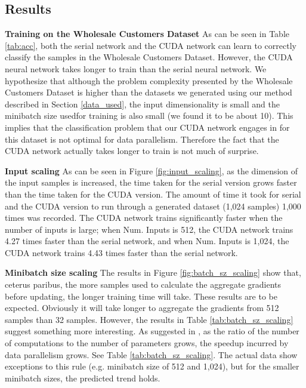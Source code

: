 \documentclass[11pt,a4paper]{article}
\begin{document}
\subsection{Results}
\noindent \textbf{Training on the Wholesale Customers Dataset}
As can be seen in Table \ref{tab:acc}, both the serial network and the CUDA network can learn to correctly classify the samples in the Wholesale Customers Dataset. However, the CUDA neural network takes longer to train than the serial neural network. We hypothesize that although the problem complexity presented by the Wholesale Customers Dataset is higher than the datasets we generated using our method described in Section \ref{data_used}, the input dimensionality is small and the minibatch size usedfor training is also small (we found it to be about 10). This implies that the classification problem that our CUDA network engages in for this dataset is not optimal for data parallelism. Therefore the fact that the CUDA network actually takes longer to train is not much of surprise.

\vspace{10pt}
\noindent \textbf{Input scaling} As can be seen in Figure \ref{fig:input_scaling}, as the dimension of the input samples is increased, the time taken for the serial version grows faster than the time taken for the CUDA version. The amount of time it took for serial and the CUDA version to run through a generated dataset (1,024 samples) 1,000 times was recorded. The CUDA network trains significantly faster when the number of inputs is large; when Num. Inputs is 512, the CUDA network trains 4.27 times faster than the serial network, and when Num. Inputs is 1,024, the CUDA network trains 4.43 times faster than the serial network. 

\vspace{10pt}
\noindent \textbf{Minibatch size scaling} The results in Figure  \ref{fig:batch_sz_scaling} show that, ceterus paribus, the more samples used to calculate the aggregate gradients before updating, the longer training time will take. These results are to be expected. Obviously it will take longer to aggregate the gradients from 512 samples than 32 samples. However, the results in Table \ref{tab:batch_sz_scaling} suggest something more interesting. As suggested in \cite{one_weird_trick_cnns}, as the ratio of the number of computations to the number of parameters grows, the speedup incurred by data parallelism grows. See Table \ref{tab:batch_sz_scaling}. The actual data show exceptions to this rule (e.g. minibatch size of 512 and 1,024), but for the smaller minibatch sizes, the predicted trend holds.
\end{document}
